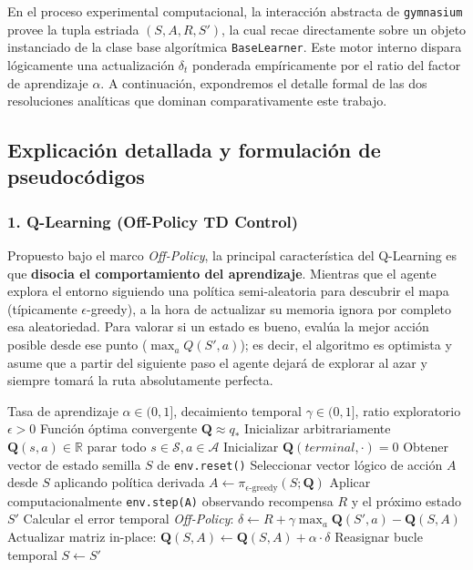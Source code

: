 En el proceso experimental computacional, la interacción abstracta de \texttt{gymnasium} provee la tupla estriada $(S, A, R, S')$, la cual recae directamente sobre un objeto instanciado de la clase base algorítmica \texttt{BaseLearner}. Este motor interno dispara lógicamente una actualización $\delta_t$ ponderada empíricamente por el ratio del factor de aprendizaje $\alpha$.  A continuación, expondremos el detalle formal de las dos resoluciones analíticas que dominan comparativamente este trabajo.

\subsection{Explicación detallada y formulación de pseudocódigos}

\subsubsection{1. Q-Learning (Off-Policy TD Control)}
Propuesto bajo el marco \textit{Off-Policy}, la principal característica del Q-Learning es que \textbf{disocia el comportamiento del aprendizaje}. Mientras que el agente explora el entorno siguiendo una política semi-aleatoria para descubrir el mapa (típicamente $\epsilon$-greedy), a la hora de actualizar su memoria ignora por completo esa aleatoriedad. Para valorar si un estado es bueno, evalúa la mejor acción posible desde ese punto ($\max_a Q(S', a)$); es decir, el algoritmo es optimista y asume que a partir del siguiente paso el agente dejará de explorar al azar y siempre tomará la ruta absolutamente perfecta.

\begin{algorithm}[H]
\caption{Q-Learning: Control Off-Policy \cite{Watkins1989}}
\label{alg:qlearning}
\begin{algorithmic}[1]
\Require Tasa de aprendizaje $\alpha \in (0, 1]$, decaimiento temporal $\gamma \in (0, 1]$, ratio exploratorio $\epsilon > 0$
\Ensure Función óptima convergente $\mathbf{Q} \approx q_*$
\State Inicializar arbitrariamente $\mathbf{Q}(s, a) \in \mathbb{R}$ parar todo $s \in \mathcal{S}, a \in \mathcal{A}$
\State Inicializar $\mathbf{Q}(terminal, \cdot) = 0$
    \State Obtener vector de estado semilla $S$ de \texttt{env.reset()}
        \State Seleccionar vector lógico de acción $A$ desde $S$ aplicando política derivada $A \leftarrow \pi_{\epsilon\text{-greedy}}(S; \mathbf{Q})$
        \State Aplicar computacionalmente \texttt{env.step(A)} observando recompensa $R$ y el próximo estado $S'$
        \State Calcular el error temporal \textit{Off-Policy}: 
        \State $\delta \leftarrow R + \gamma \max_{a} \mathbf{Q}(S', a) - \mathbf{Q}(S, A)$
        \State Actualizar matriz in-place:
        \State $\mathbf{Q}(S, A) \leftarrow \mathbf{Q}(S, A) + \alpha \cdot \delta$
        \State Reasignar bucle temporal $S \leftarrow S'$
    \EndWhile
\EndFor
\end{algorithmic}
\end{algorithm}


